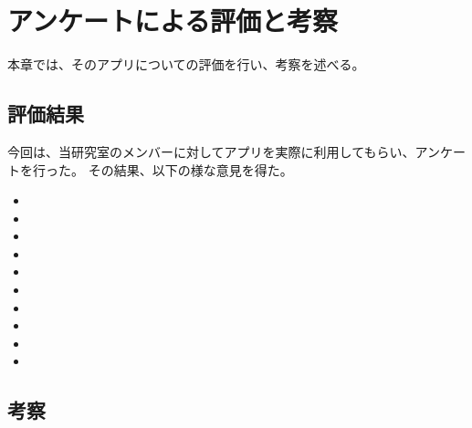 \chapter{アンケートによる評価と考察}
\label{chap:result}

本章では、そのアプリについての評価を行い、考察を述べる。

\section{評価結果}
今回は、当研究室のメンバーに対してアプリを実際に利用してもらい、アンケートを行った。
その結果、以下の様な意見を得た。
\begin{itemize}
\item 
\item 
\item 
\item 
\item 
\item 
\item 
\item 
\item 
\item 
\end{itemize}



\section{考察}
